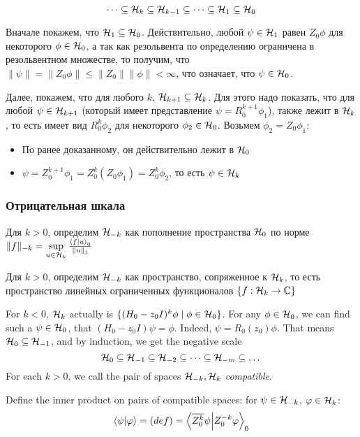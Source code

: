 \begin{prop}
\[
\dots \subseteq \mathcal{H}_{k} \subseteq \mathcal{H}_{k - 1} \subseteq \dots \subseteq \mathcal{H}_{1} \subseteq{\mathcal{H}_{0}}
\]
\end{prop}
Вначале покажем, что $\mathcal{H}_{1} \subseteq \mathcal{H}_{0}$. Действительно, любой $\psi \in \mathcal{H}_{1}$ равен $Z_0 \phi$ для некоторого $\phi \in \mathcal{H}_{0}$, а так как резольвента по определению ограничена в резольвентном множестве, то получим, что $\| \psi \| = \| Z_0 \phi \| \le \|Z_0\| \|\phi\| < \infty$, что означает, что $\psi \in \mathcal{H}_{0}$.

Далее, покажем, что для любого $k$, $\mathcal{H}_{k + 1} \subseteq \mathcal{H}_{k}$. Для этого надо показать, что для любой $\psi \in \mathcal{H}_{k + 1}$ (который имеет представление $\psi = R_0^{k + 1} \phi_1$), также лежит в $\mathcal{H}_{k}$, то есть имеет вид $R_0^k \phi_2$ для некоторого $\phi_2 \in \mathcal{H}_{0}$. Возьмем $\phi_2 = Z_0 \phi_1$:
\begin{itemize}
\item По ранее доказанному, он действительно лежит в $\mathcal{H}_{0}$
\item $\psi = Z_0^{k + 1} \phi_1 = Z_0^k (Z_0 \phi_1) = Z_0^k \phi_2$, то есть $\psi \in \mathcal{H}_{k}$
\end{itemize}

\subsubsection{Отрицательная шкала}
Для $k > 0$, определим $\mathcal{H}_{-k}$ как пополнение пространства $\mathcal{H}_{0}$ по норме $\|f \|_{-k} = \sup\limits_{u \in \hilb{k}} \frac{\ip{f}{u}_0}{\|u\|_j}$

Для $k > 0$, определим $\mathcal{H}_{-k}$ как пространство, сопряженное к $\mathcal{H}_{k}$, то есть пространство линейных ограниченных функционалов $\{ f: \mathcal{H}_{k} \to \mathbb{C} \}$


For $k < 0$, $\mathcal{H}_{k}$ actually is $\{ (H_0 - z_0 I)^k \phi \mid \phi \in \mathcal{H}_{0} \}$.
For any $\phi \in \mathcal{H}_{0}$, we can find such a $\psi \in \mathcal{H}_{0}$, that $(H_0 - z_0 I) \psi = \phi$. Indeed, $\psi = R_0(z_0) \phi$. That means $\mathcal{H}_{0} \subseteq \mathcal{H}_{-1}$, and by induction, we get the negative scale
\[
\mathcal{H}_{0} \subseteq \mathcal{H}_{-1} \subseteq \mathcal{H}_{-2} \subseteq \dots \subseteq \mathcal{H}_{-m} \subseteq \dots
\] 
For each $k > 0$, we call the pair of spaces $\mathcal{H}_{-k}, \mathcal{H}_{k}$ \textit{compatible}.

Define the inner product on pairs of compatible spaces: for $\psi \in \mathcal{H}_{-k}$, $\varphi \in \mathcal{H}_{k}$:
\[
\ip{\psi}{\varphi} = (def) = \ip{\cconj{Z_0^k} \psi}{Z_0^{-k} \varphi}_0
\]

